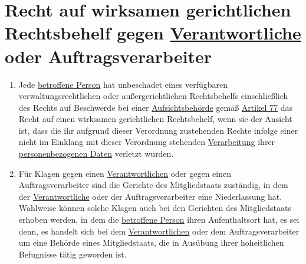 \chapter{Recht auf wirksamen gerichtlichen Rechtsbehelf gegen \hyperref[itm:04-7]{Verantwortliche} oder Auftragsverarbeiter}
\label{ch:79}


\begin{enumerate}

  \item Jede \hyperref[itm:04-1]{betroffene Person} hat unbeschadet eines verfügbaren verwaltungsrechtlichen oder außergerichtlichen
   Rechtsbehelfs einschließlich des Rechts auf Beschwerde bei einer \hyperref[itm:04-21]{Aufsichtsbehörde} gemäß \hyperref[ch:77]{Artikel 77}
   das Recht auf einen wirksamen gerichtlichen Rechtsbehelf, wenn sie der Ansicht ist, dass die ihr aufgrund dieser
   Verordnung zustehenden Rechte infolge einer nicht im Einklang mit dieser Verordnung stehenden \hyperref[itm:04-2]{Verarbeitung} ihrer
   \hyperref[itm:04-1]{personenbezogenen Daten} verletzt wurden.
  \label{itm:79-1}

  \item Für Klagen gegen einen \hyperref[itm:04-7]{Verantwortlichen} oder gegen einen Auftragsverarbeiter sind die Gerichte des
   Mitgliedstaats zuständig, in dem der \hyperref[itm:04-7]{Verantwortliche} oder der Auftragsverarbeiter eine Niederlassung hat. Wahlweise
   können solche Klagen auch bei den Gerichten des Mitgliedstaats erhoben werden, in dem die \hyperref[itm:04-1]{betroffene Person} ihren
   Aufenthaltsort hat, es sei denn, es handelt sich bei dem \hyperref[itm:04-7]{Verantwortlichen} oder dem Auftragsverarbeiter um eine
   Behörde eines Mitgliedstaats, die in Ausübung ihrer hoheitlichen Befugnisse tätig geworden ist.
  \label{itm:79-2}

\end{enumerate}


